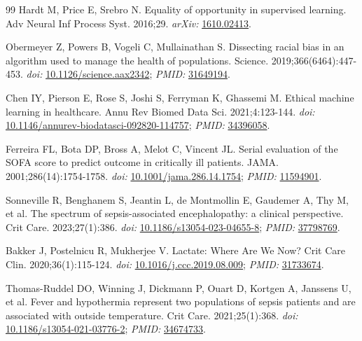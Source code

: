 \documentclass[10pt,twocolumn,letterpaper]{article}
\begin{document}
\begin{thebibliography}{99}
Hardt M, Price E, Srebro N. Equality of opportunity in supervised learning. Adv Neural Inf Process Syst. 2016;29. \textit{arXiv:} \href{https://arxiv.org/abs/1610.02413}{1610.02413}.

Obermeyer Z, Powers B, Vogeli C, Mullainathan S. Dissecting racial bias in an algorithm used to manage the health of populations. Science. 2019;366(6464):447-453. \textit{doi:} \href{https://doi.org/10.1126/science.aax2342}{10.1126/science.aax2342}; \textit{PMID:} \href{https://pubmed.ncbi.nlm.nih.gov/31649194/}{31649194}.

Chen IY, Pierson E, Rose S, Joshi S, Ferryman K, Ghassemi M. Ethical machine learning in healthcare. Annu Rev Biomed Data Sci. 2021;4:123-144. \textit{doi:} \href{https://doi.org/10.1146/annurev-biodatasci-092820-114757}{10.1146/annurev-biodatasci-092820-114757}; \textit{PMID:} \href{https://pubmed.ncbi.nlm.nih.gov/34396058/}{34396058}.

Ferreira FL, Bota DP, Bross A, Melot C, Vincent JL. Serial evaluation of the SOFA score to predict outcome in critically ill patients. JAMA. 2001;286(14):1754-1758. \textit{doi:} \href{https://doi.org/10.1001/jama.286.14.1754}{10.1001/jama.286.14.1754}; \textit{PMID:} \href{https://pubmed.ncbi.nlm.nih.gov/11594901/}{11594901}.

Sonneville R, Benghanem S, Jeantin L, de Montmollin E, Gaudemer A, Thy M, et al. The spectrum of sepsis-associated encephalopathy: a clinical perspective. Crit Care. 2023;27(1):386. \textit{doi:} \href{https://doi.org/10.1186/s13054-023-04655-8}{10.1186/s13054-023-04655-8}; \textit{PMID:} \href{https://pubmed.ncbi.nlm.nih.gov/37798769/}{37798769}.

Bakker J, Postelnicu R, Mukherjee V. Lactate: Where Are We Now? Crit Care Clin. 2020;36(1):115-124. \textit{doi:} \href{https://doi.org/10.1016/j.ccc.2019.08.009}{10.1016/j.ccc.2019.08.009}; \textit{PMID:} \href{https://pubmed.ncbi.nlm.nih.gov/31733674/}{31733674}.

Thomas-Ruddel DO, Winning J, Dickmann P, Ouart D, Kortgen A, Janssens U, et al. Fever and hypothermia represent two populations of sepsis patients and are associated with outside temperature. Crit Care. 2021;25(1):368. \textit{doi:} \href{https://doi.org/10.1186/s13054-021-03776-2}{10.1186/s13054-021-03776-2}; \textit{PMID:} \href{https://pubmed.ncbi.nlm.nih.gov/34674733/}{34674733}.


\end{thebibliography}
\end{document}
